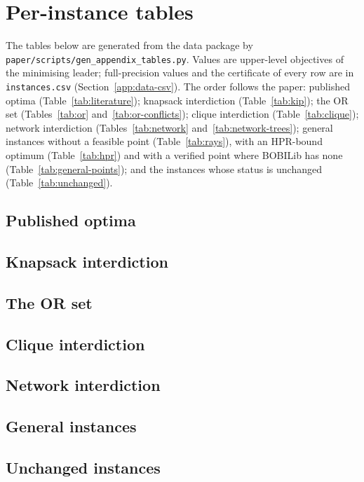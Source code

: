 \section{Per-instance tables}\label{app:tables}

The tables below are generated from the data package by
\texttt{paper/scripts/gen\_appendix\_tables.py}. Values are upper-level
objectives of the minimising leader; full-precision values and the
certificate of every row are in \texttt{instances.csv}
(Section~\ref{app:data-csv}). The order follows the paper:
published optima (Table~\ref{tab:literature}); knapsack interdiction
(Table~\ref{tab:kip}); the OR set (Tables~\ref{tab:or} and~\ref{tab:or-conflicts}); clique
interdiction (Table~\ref{tab:clique}); network interdiction
(Tables~\ref{tab:network} and~\ref{tab:network-trees}); general instances
without a feasible point (Table~\ref{tab:rays}), with an HPR-bound optimum
(Table~\ref{tab:hpr}) and with a verified point where BOBILib has none (Table~\ref{tab:general-points});
and the instances whose status is unchanged (Table~\ref{tab:unchanged}).

\subsection{Published optima}


\subsection{Knapsack interdiction}


\subsection{The OR set}



\subsection{Clique interdiction}


\subsection{Network interdiction}


\subsection{General instances}




\subsection{Unchanged instances}

